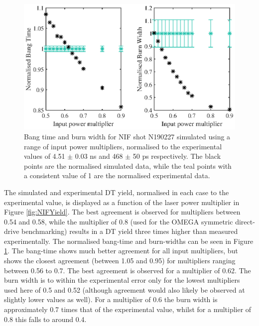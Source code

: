 \begin{figure}[ht]
\centering
\includegraphics{figures/LowCR/BenchmarkNifBangTime.eps}
\caption{Bang time and burn width for NIF shot N190227 simulated using a range of input power multipliers, normalised to the experimental values of 4.51 $\pm$ 0.03 ns and 468 $\pm$ 50 ps respectively. The black points are the normalised simulated data, while the teal points with a consistent value of 1 are the normalised experimental data.}
\label{fig:NIFBT}
\end{figure}

The simulated and experimental DT yield, normalised in each case to the experimental value, is displayed as a function of the laser power multiplier in Figure \ref{fig:NIFYield}. The best agreement is observed for multipliers between 0.54 and 0.58, while the multiplier of 0.8 (used for the OMEGA symmetric direct-drive benchmarking) results in a DT yield three times higher than measured experimentally. The normalised bang-time and burn-widths can be seen in Figure \ref{fig:NIFBT}. The bang-time shows much better agreement for all input multipliers, but shows the closest agreement (between 1.05 and 0.95) for multipliers ranging between 0.56 to 0.7. The best agreement is observed for a multiplier of 0.62. The burn width is to within the experimental error only for the lowest multipliers used here of 0.5 and 0.52 (although agreement would also likely be observed at slightly lower values as well). For a multiplier of 0.6 the burn width is approximately 0.7 times that of the experimental value, whilst for a multiplier of 0.8 this falls to around 0.4.

